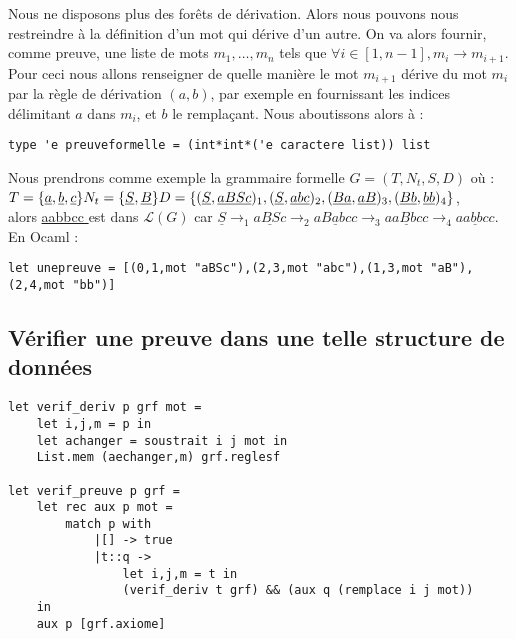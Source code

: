 \documentclass[a4paper,12pt]{article}
\begin{document}
Nous ne disposons plus des forêts de dérivation. Alors nous pouvons nous restreindre à la définition d'un mot qui dérive d'un autre.
On va alors fournir, comme preuve, une liste de mots $m_1, \dots, m_n$ tels que $\forall i\in [1,n-1], m_i \rightarrow m_{i+1}$. 
Pour ceci nous allons renseigner de quelle manière le mot $m_{i+1}$ dérive du mot $m_i$ par la règle de dérivation $(a,b)$, par exemple en fournissant les indices délimitant $a$ dans $m_i$, et $b$ le remplaçant.
Nous aboutissons alors à :
\begin{verbatim}
type 'e preuveformelle = (int*int*('e caractere list)) list
\end{verbatim}

Nous prendrons comme exemple la grammaire formelle $G = (T,N_t,S,D)$ où :\\
$
T = \{\underline{ a },\underline{ b },\underline{ c }\}\\
N_t = \{\underline{ S },\underline{ B }\}\\
D = \{(\underline{ S },\underline{ aBSc })_1,(\underline{ S },\underline{ abc })_2,(\underline{ Ba },\underline{ aB })_3,(\underline{ Bb },\underline{ bb })_4\}
$,\\
alors \underline{ aabbcc } est dans $\mathcal{L}(G)$ car $\underline{ S } \rightarrow_1 \underline{ aBSc } \rightarrow_2 \underline{ aBabcc } \rightarrow_3 \underline{ aaBbcc } \rightarrow_4 \underline{ aabbcc }$.\\
En Ocaml :
\begin{verbatim}
let unepreuve = [(0,1,mot "aBSc"),(2,3,mot "abc"),(1,3,mot "aB"),(2,4,mot "bb")]
\end{verbatim}

\subsection{Vérifier une preuve dans une telle structure de données}

\begin{verbatim}
let verif_deriv p grf mot = 
    let i,j,m = p in
    let achanger = soustrait i j mot in
    List.mem (aechanger,m) grf.reglesf

let verif_preuve p grf = 
    let rec aux p mot = 
        match p with
            |[] -> true
            |t::q -> 
                let i,j,m = t in
                (verif_deriv t grf) && (aux q (remplace i j mot))
    in 
    aux p [grf.axiome]

\end{verbatim}
\end{document}
